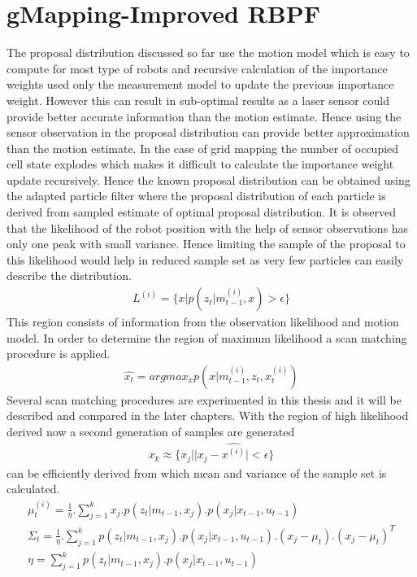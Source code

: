 \section{gMapping-Improved RBPF}
The proposal distribution discussed so far use the motion model which is easy to compute for most type of robots and recursive calculation of the importance weights used only the measurement model to update the previous importance weight. However this can result in sub-optimal results as a laser sensor could provide better accurate information than the motion estimate. Hence using the sensor observation in the proposal distribution can provide better approximation than the motion estimate. In the case of grid mapping the number of occupied cell state explodes which makes it difficult to calculate the importance weight update recursively. Hence the known proposal distribution can be obtained using the adapted particle filter where the proposal distribution of each particle is derived from sampled estimate of optimal proposal distribution. It is observed that the likelihood of the robot position with the help of sensor observations has only one peak with small variance. Hence limiting the sample of the proposal to this likelihood would help in reduced sample set as very few particles can easily describe the distribution. 
\begin{gather} \label{gMap-L}
    L^{(i)} = \{ x | p(z_t| m_{t-1}^{(i)},x)>\epsilon\} 
\end{gather}
This region consists of information from the observation likelihood and motion model. In order to determine the region of maximum likelihood a scan matching procedure is applied. 
\begin{gather} \label{gMap-SM}
    \hat{x_t} = argmax_x p(x|m_{t-1}^{(i)}, z_t, x_t^{(i)})
\end{gather}
Several scan matching procedures are experimented in this thesis and it will be described and compared in the later chapters. With the region of high likelihood derived now a second generation of samples are generated 
\begin{gather} \label{gMap-2samp}
    x_k \approx \{x_j | |x_j - \hat{x^{(i)}}|<\epsilon \}
\end{gather}
can be efficiently derived from which mean and variance of the sample set is calculated. 
\begin{gather} \label{gMap-mu}
    \mu_t^{(i)} = \frac{1}{\eta}. \sum_{j = 1}^{k}  x_j.p(z_t | m_{t-1}, x_j). p(x_j | x_{t-1}, u_{t-1}) \\
    \varSigma_t = \frac{1}{\eta}. \sum_{j = 1}^{k}  p(z_t | m_{t-1}, x_j). p(x_j | x_{t-1}, u_{t-1}).(x_j - \mu_t).(x_j - \mu_t)^T \\
    \eta = \sum_{j = 1}^{k}  p(z_t | m_{t-1}, x_j). p(x_j | x_{t-1}, u_{t-1})
\end{gather}
